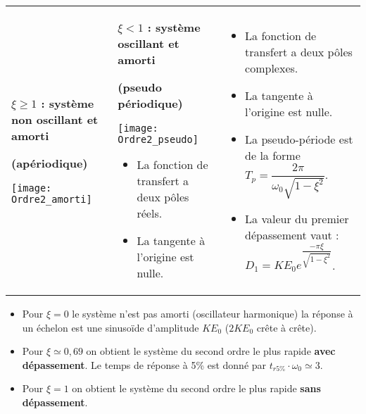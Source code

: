 \begin{resultat}
\begin{center}
\begin{tabular}{p{.4\linewidth}p{.58\linewidth}}
\begin{center}
\textbf{$\xi \geq 1$ : système non oscillant et amorti}

\textbf{(apériodique)}

\texttt{[image: Ordre2\_amorti]}
\end{center} 
& 
\begin{center}
\textbf{$\xi <1$ : système oscillant et amorti }

\textbf{(pseudo périodique)}

\texttt{[image: Ordre2\_pseudo]}
\end{center} 
\begin{itemize} 
\item La fonction de transfert a deux pôles réels.
\item La tangente à l'origine est nulle.
\end{itemize}
& 
\begin{itemize} 
\item La fonction de transfert a deux pôles complexes.
\item La tangente à l'origine est nulle.
\item La pseudo-période est de la forme $T_p=\dfrac{2\pi }{\omega_0 \sqrt{1-\xi^2}}$.
\item La valeur du premier dépassement vaut :  $D_1=KE_0e^{\dfrac{-\pi \xi }{\sqrt{1-\xi^2}}}$.
\end{itemize}
\end{tabular}
\end{center}
\end{resultat}

\begin{resultat}
\begin{itemize}
\item Pour $\xi=0$ le système n'est pas amorti (oscillateur harmonique) la réponse à un échelon est une sinusoïde d'amplitude $KE_0$ ($2KE_0$ crête à crête).  
\item Pour $\xi\simeq 0,69$  on obtient le système du second ordre le plus rapide \textbf{avec dépassement}. 
Le temps de réponse à 5\% est donné par $t_{r 5\%} \cdot \omega_0 \simeq 3$.
\item Pour $\xi =1$ on obtient le système du second ordre le plus rapide \textbf{sans dépassement}.

\end{itemize}
\end{resultat}

